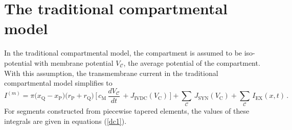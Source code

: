 \section{The traditional compartmental model}
In the traditional compartmental model, the compartment is assumed
to be iso-potential with membrane potential $V_\mathcal{C}$, the
average potential of the compartment. With this assumption, the
transmembrane current in the traditional compartmental model
simplifies to
\begin{equation}\label{tc00}
I^{(m)} = \pi\big(x_\mathrm{Q}-x_\mathrm{P}\big)
\big(r_\mathrm{P}+r_\mathrm{Q}\big)\,\Big[\,c_\mathrm{M}\,
\frac{dV_\mathcal{C}}{dt}\,+J_\mathrm{IVDC}(V_\mathrm{C})\,\Big]
+\sum_\mathcal{C}\,J_\mathrm{SYN}(V_\mathrm{C})
+\sum_\mathcal{C}\,I_\mathrm{EX}(x,t)\,.
\end{equation}
For segments constructed from piecewise tapered elements,
the values of these integrals are given in equations (\ref{dc1}).

